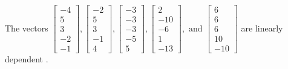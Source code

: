 \begin{exercise}
\begin{exerciseStatement}
  \end{exerciseStatement}
  \begin{exerciseAnswer}
   The vectors \(\left[\begin{array}{r}
-4 \\
5 \\
3 \\
-2 \\
-1
\end{array}\right] , \left[\begin{array}{r}
-2 \\
5 \\
3 \\
-1 \\
4
\end{array}\right] , \left[\begin{array}{r}
-3 \\
-3 \\
-3 \\
-5 \\
5
\end{array}\right] , \left[\begin{array}{r}
2 \\
-10 \\
-6 \\
1 \\
-13
\end{array}\right] , \text{ and } \left[\begin{array}{r}
6 \\
6 \\
6 \\
10 \\
-10
\end{array}\right]\) are 
  	 linearly dependent  .
  


  \end{exerciseAnswer}
\end{exercise}